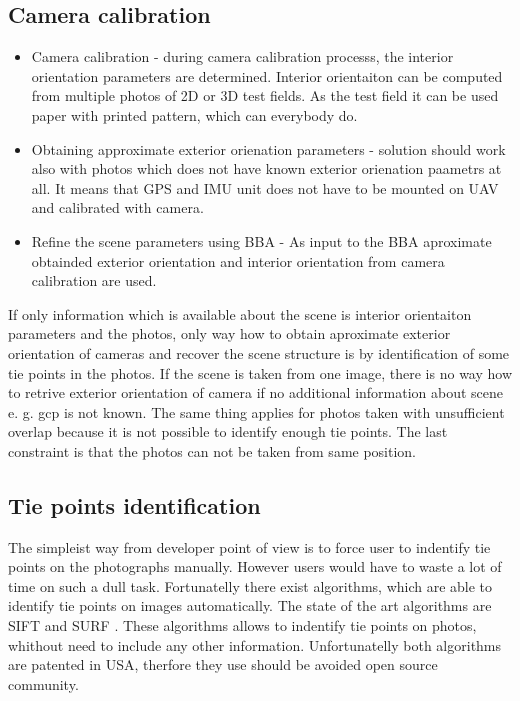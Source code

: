 \documentclass[a4paper,12pt]{report}
\begin{document}
\subsection{Camera calibration}
\begin{itemize}
\item Camera calibration - during camera calibration processs, the interior orientation parameters 
			   are determined.
		             Interior orientaiton can be computed 
			     from multiple photos of 2D or 3D test fields. As the test field it can be used 
			     paper with printed pattern, which can everybody do. 
				
\item Obtaining approximate exterior orienation parameters - solution should work also with photos 
which does not have known exterior orienation paametrs at all. It means 
that GPS and IMU unit does not have to be mounted on UAV and calibrated with camera.
  

\item Refine the scene parameters using BBA - As input to the BBA aproximate obtainded exterior orientation
and interior orientation from camera calibration are used.

\end{itemize}

If only information which is available about the scene is interior orientaiton parameters and the photos, 
only way how to obtain aproximate exterior orientation of cameras and recover the scene structure is 
by identification of some tie points in the photos. If the scene is taken from one image, there is no way how
to retrive exterior orientation of camera if no additional information about scene e. g. gcp is not known. 
The same thing applies for photos taken with  unsufficient overlap because it is not possible to 
identify enough tie points. The last constraint is that the photos can not be taken from same position.

\subsection{Tie points identification}

The simpleist way from developer point of view is to force user to indentify tie points on 
the photographs manually. However users would have to waste a lot of time on such a 
dull task. Fortunatelly there  exist algorithms, which are able to identify tie points on images
automatically. The state of the art algorithms are SIFT \cite{wiki:SIFT} and SURF \cite{wiki:SURF}.
These algorithms allows to indentify tie points on photos, whithout need to include any other information.
Unfortunatelly both algorithms are patented in USA, therfore they use should be avoided open source community.
\end{document}
